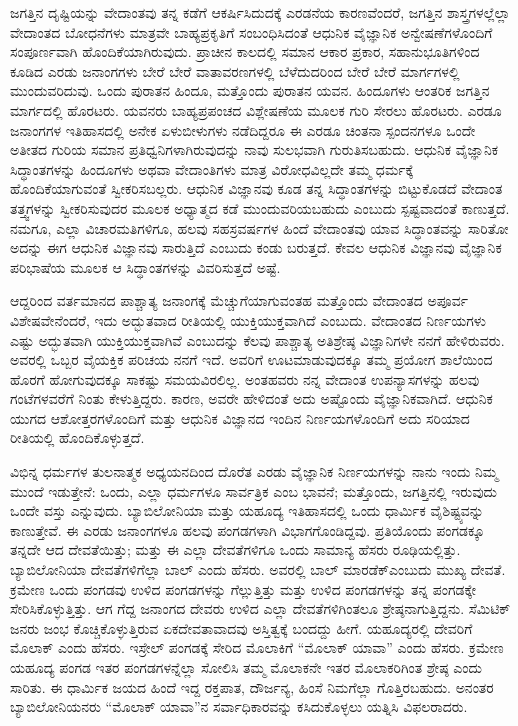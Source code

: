 ಜಗತ್ತಿನ ದೃಷ್ಟಿಯನ್ನು ವೇದಾಂತವು ತನ್ನ ಕಡೆಗೆ ಆಕರ್ಷಿಸಿದುದಕ್ಕೆ ಎರಡನೆಯ ಕಾರಣವೆಂದರೆ, ಜಗತ್ತಿನ ಶಾಸ್ತ್ರಗಳಲ್ಲೆಲ್ಲಾ ವೇದಾಂತದ ಬೋಧನೆಗಳು ಮಾತ್ರವೇ ಬಾಹ್ಯಪ್ರಕೃತಿಗೆ ಸಂಬಂಧಿಸಿದಂತೆ ಆಧುನಿಕ ವೈಜ್ಞಾನಿಕ ಅನ್ವೇಷಣೆಗಳೊಂದಿಗೆ ಸಂಪೂರ್ಣವಾಗಿ ಹೊಂದಿಕೆಯಾಗಿರುವುದು. ಪ್ರಾಚೀನ ಕಾಲದಲ್ಲಿ ಸಮಾನ ಆಕಾರ ಪ್ರಕಾರ, ಸಹಾನುಭೂತಿಗಳಿಂದ ಕೂಡಿದ ಎರಡು ಜನಾಂಗಗಳು ಬೇರೆ ಬೇರೆ ವಾತಾವರಣಗಳಲ್ಲಿ ಬೆಳೆದುದರಿಂದ ಬೇರೆ ಬೇರೆ ಮಾರ್ಗಗಳಲ್ಲಿ ಮುಂದುವರಿದುವು. ಒಂದು ಪುರಾತನ ಹಿಂದೂ, ಮತ್ತೊಂದು ಪುರಾತನ ಯವನ. ಹಿಂದೂಗಳು ಆಂತರಿಕ ಜಗತ್ತಿನ ಮಾರ್ಗದಲ್ಲಿ ಹೊರಟರು. ಯವನರು ಬಾಹ್ಯಪ್ರಪಂಚದ ವಿಶ್ಲೇಷಣೆಯ ಮೂಲಕ ಗುರಿ ಸೇರಲು ಹೊರಟರು. ಎರಡೂ ಜನಾಂಗಗಳ ಇತಿಹಾಸದಲ್ಲಿ ಅನೇಕ ಏಳುಬೀಳುಗಳು ನಡೆದಿದ್ದರೂ ಈ ಎರಡೂ ಚಿಂತನಾ ಸ್ಪಂದನಗಳೂ ಒಂದೇ ಅತೀತದ ಗುರಿಯ ಸಮಾನ ಪ್ರತಿಧ್ವನಿಗಳಾಗಿರುವುದನ್ನು ನಾವು ಸುಲಭವಾಗಿ ಗುರುತಿಸಬಹುದು. ಆಧುನಿಕ ವೈಜ್ಞಾನಿಕ ಸಿದ್ಧಾಂತಗಳನ್ನು ಹಿಂದೂಗಳು ಅಥವಾ ವೇದಾಂತಿಗಳು ಮಾತ್ರ ವಿರೋಧವಿಲ್ಲದೇ ತಮ್ಮ ಧರ್ಮಕ್ಕೆ ಹೊಂದಿಕೆಯಾಗುವಂತೆ ಸ್ವೀಕರಿಸಬಲ್ಲರು. ಆಧುನಿಕ ವಿಜ್ಞಾನವು ಕೂಡ ತನ್ನ ಸಿದ್ಧಾಂತಗಳನ್ನು ಬಿಟ್ಟುಕೊಡದೆ ವೇದಾಂತ ತತ್ತ್ವಗಳನ್ನು ಸ್ವೀಕರಿಸುವುದರ ಮೂಲಕ ಅಧ್ಯಾತ್ಮದ ಕಡೆ ಮುಂದುವರಿಯಬಹುದು ಎಂಬುದು ಸ್ಪಷ್ಟವಾದಂತೆ ಕಾಣುತ್ತದೆ. ನಮಗೂ, ಎಲ್ಲಾ ವಿಚಾರಮತಿಗಳಿಗೂ, ಹಲವು ಸಹಸ್ರವರ್ಷಗಳ ಹಿಂದೆ ವೇದಾಂತವು ಯಾವ ಸಿದ್ಧಾಂತವನ್ನು ಸಾರಿತೋ ಅದನ್ನು ಈಗ ಆಧುನಿಕ ವಿಜ್ಞಾನವು ಸಾರುತ್ತಿದೆ ಎಂಬುದು ಕಂಡು ಬರುತ್ತದೆ. ಕೇವಲ ಆಧುನಿಕ ವಿಜ್ಞಾನವು ವೈಜ್ಞಾನಿಕ ಪರಿಭಾಷೆಯ ಮೂಲಕ ಆ ಸಿದ್ಧಾಂತಗಳನ್ನು ವಿವರಿಸುತ್ತದೆ ಅಷ್ಟೆ. 

ಆದ್ದರಿಂದ ವರ್ತಮಾನದ ಪಾಶ್ಚಾತ್ಯ ಜನಾಂಗಕ್ಕೆ ಮೆಚ್ಚುಗೆಯಾಗುವಂತಹ ಮತ್ತೊಂದು ವೇದಾಂತದ ಅಪೂರ್ವ ವಿಶೇಷವೇನೆಂದರೆ, ಇದು ಅದ್ಭುತವಾದ ರೀತಿಯಲ್ಲಿ ಯುಕ್ತಿಯುಕ್ತವಾಗಿದೆ ಎಂಬುದು. ವೇದಾಂತದ ನಿರ್ಣಯಗಳು ಎಷ್ಟು ಅದ್ಭುತವಾಗಿ ಯುಕ್ತಿಯುಕ್ತವಾಗಿವೆ ಎಂಬುದನ್ನು ಕೆಲವು ಪಾಶ್ಚಾತ್ಯ ಅತಿಶ್ರೇಷ್ಠ ವಿಜ್ಞಾನಿಗಳೇ ನನಗೆ ಹೇಳಿರುವರು. ಅವರಲ್ಲಿ ಒಬ್ಬರ ವೈಯಕ್ತಿಕ ಪರಿಚಯ ನನಗೆ ಇದೆ. ಅವರಿಗೆ ಊಟಮಾಡುವುದಕ್ಕೂ ತಮ್ಮ ಪ್ರಯೋಗ ಶಾಲೆಯಿಂದ ಹೊರಗೆ ಹೋಗುವುದಕ್ಕೂ ಸಾಕಷ್ಟು ಸಮಯವಿರಲಿಲ್ಲ. ಅಂತಹವರು ನನ್ನ ವೇದಾಂತ ಉಪನ್ಯಾಸಗಳನ್ನು ಹಲವು ಗಂಟೆಗಳವರೆಗೆ ನಿಂತು ಕೇಳುತ್ತಿದ್ದರು. ಕಾರಣ, ಅವರೇ ಹೇಳಿದಂತೆ ಅದು ಅಷ್ಟೊಂದು ವೈಜ್ಞಾನಿಕವಾಗಿದೆ. ಆಧುನಿಕ ಯುಗದ ಆಶೋತ್ತರಗಳೊಂದಿಗೆ ಮತ್ತು ಆಧುನಿಕ ವಿಜ್ಞಾನದ ಇಂದಿನ ನಿರ್ಣಯಗಳೊಂದಿಗೆ ಅದು ಸರಿಯಾದ ರೀತಿಯಲ್ಲಿ ಹೊಂದಿಕೊಳ್ಳುತ್ತದೆ. 

ವಿಭಿನ್ನ ಧರ್ಮಗಳ ತುಲನಾತ್ಮಕ ಅಧ್ಯಯನದಿಂದ ದೊರೆತ ಎರಡು ವೈಜ್ಞಾನಿಕ ನಿರ್ಣಯಗಳನ್ನು ನಾನು ಇಂದು ನಿಮ್ಮ ಮುಂದೆ ಇಡುತ್ತೇನೆ: ಒಂದು, ಎಲ್ಲಾ ಧರ್ಮಗಳೂ ಸಾರ್ವತ್ರಿಕ ಎಂಬ ಭಾವನೆ; ಮತ್ತೊಂದು, ಜಗತ್ತಿನಲ್ಲಿ ಇರುವುದು ಒಂದೇ ವಸ್ತು ಎನ್ನುವುದು. ಬ್ಯಾಬಿಲೋನಿಯಾ ಮತ್ತು ಯಹೂದ್ಯ ಇತಿಹಾಸದಲ್ಲಿ ಒಂದು ಧಾರ್ಮಿಕ ವೈಶಿಷ್ಟ್ಯವನ್ನು ಕಾಣುತ್ತೇವೆ. ಈ ಎರಡು ಜನಾಂಗಗಳೂ ಹಲವು ಪಂಗಡಗಳಾಗಿ ವಿಭಾಗಗೊಂಡಿದ್ದವು. ಪ್ರತಿಯೊಂದು ಪಂಗಡಕ್ಕೂ ತನ್ನದೇ ಆದ ದೇವತೆಯಿತ್ತು; ಮತ್ತು ಈ ಎಲ್ಲಾ ದೇವತೆಗಳಿಗೂ ಒಂದು ಸಾಮಾನ್ಯ ಹೆಸರು ರೂಢಿಯಲ್ಲಿತ್ತು. ಬ್ಯಾಬಿಲೋನಿಯಾ ದೇವತೆಗಳಿಗೆಲ್ಲಾ ಬಾಲ್​ ಎಂದು ಹೆಸರು. ಅವರಲ್ಲಿ ಬಾಲ್​ ಮಾರಡೆಕ್​ ಎಂಬುದು ಮುಖ್ಯ ದೇವತೆ. ಕ್ರಮೇಣ ಒಂದು ಪಂಗಡವು ಉಳಿದ ಪಂಗಡಗಳನ್ನು ಗೆಲ್ಲುತ್ತಿತ್ತು ಮತ್ತು ಉಳಿದ ಪಂಗಡಗಳನ್ನು ತನ್ನ ಪಂಗಡಕ್ಕೇ ಸೇರಿಸಿಕೊಳ್ಳುತ್ತಿತ್ತು. ಆಗ ಗೆದ್ದ ಜನಾಂಗದ ದೇವರು ಉಳಿದ ಎಲ್ಲಾ ದೇವತೆಗಳಿಗಿಂತಲೂ ಶ್ರೇಷ್ಠನಾಗುತ್ತಿದ್ದನು. ಸೆಮಿಟಿಕ್​ ಜನರು ಜಂಭ ಕೊಚ್ಚಿಕೊಳ್ಳುತ್ತಿರುವ ಏಕದೇವತಾವಾದವು ಅಸ್ತಿತ್ವಕ್ಕೆ ಬಂದದ್ದು ಹೀಗೆ. ಯಹೂದ್ಯರಲ್ಲಿ ದೇವರಿಗೆ ಮೊಲಾಕ್​ ಎಂದು ಹೆಸರು. ಇಸ್ರೇಲ್​ ಪಂಗಡಕ್ಕೆ ಸೇರಿದ ಮೊಲಾಕಿಗೆ “ಮೊಲಾಕ್​ ಯಾವಾ” ಎಂದು ಹೆಸರು. ಕ್ರಮೇಣ ಯಹೂದ್ಯ ಪಂಗಡ ಇತರ ಪಂಗಡಗಳನ್ನೆಲ್ಲಾ ಸೋಲಿಸಿ ತಮ್ಮ ಮೊಲಾಕನೇ ಇತರ ಮೊಲಾಕರಿಗಿಂತ ಶ್ರೇಷ್ಠ ಎಂದು ಸಾರಿತು. ಈ ಧಾರ್ಮಿಕ ಜಯದ ಹಿಂದೆ ಇದ್ದ ರಕ್ತಪಾತ, ದೌರ್ಜನ್ಯ, ಹಿಂಸೆ ನಿಮಗೆಲ್ಲಾ ಗೊತ್ತಿರಬಹುದು. ಅನಂತರ ಬ್ಯಾಬಿಲೋನಿಯನರು “ಮೊಲಾಕ್​ ಯಾವಾ”ನ ಸರ್ವಾಧಿಕಾರವನ್ನು ಕಸಿದುಕೊಳ್ಳಲು ಯತ್ನಿಸಿ ವಿಫಲರಾದರು. 

